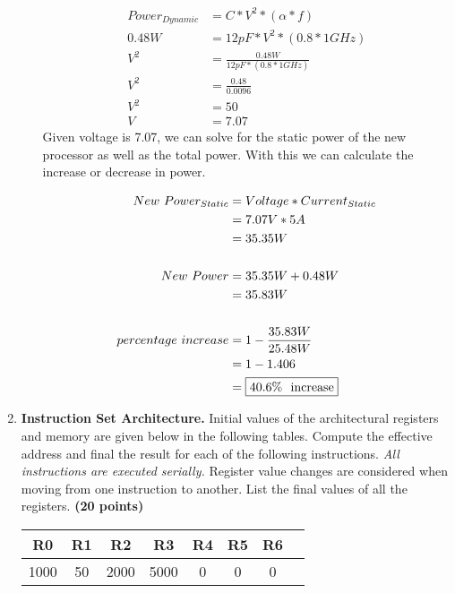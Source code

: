\documentclass[a4paper, 15pt]{exam}
\begin{document}
\begin{enumerate}
\begin{enumerate}
      \begin{align*}
   			Power_{Dynamic} &= C * V^2 * (\alpha * f)\\
   			0.48W &= 12pF * V^2 * (0.8 * 1GHz) \\
   			V^2 &= \frac{0.48W}{12pF * (0.8 * 1GHz)} \\
   			V^2 &= \frac{0.48}{0.0096} \\
   			V^2 &= 50 \\
   			V &= 7.07
   	\end{align*}
   	Given voltage is 7.07, we can solve for the static power of the new processor as well as the total power. With this we can calculate the increase or decrease in power.
   	
   	\begin{align*}
   	New \ Power_{Static} &= Voltage * Current_{Static} \\
   			&= 7.07V * 5A \\
   			&= 35.35W \\ \\	
   	New \ Power &= 35.35W + 0.48W \\
   	&= 35.83W \\ \\
   	   			percentage \ increase &= 1 - \frac{35.83W}{25.48W} \\
   			&= 1 - 1.406 \\
   			&= \fbox{40.6\% \ increase}
   	\end{align*}

	\end{enumerate}

 \item \textbf{Instruction Set Architecture.} Initial values of the architectural registers and memory are given below in the following tables. Compute the effective address and final the result for each of the following instructions. \textit{All instructions are executed serially.} Register value changes are considered when moving from one instruction to another. List the final values of all the registers. \textbf{(20 points)} 
 
 \begin{center}
 	\begin{tabular}{ |c|c|c|c|c|c|c|c|} 
 		\hline
 		R0 & R1 & R2& R3 & R4 &R5&R6\\ 
 		\hline
 		1000 & 50 & 2000 & 5000 &0 & 0 & 0\\ 
 		\hline
 	\end{tabular}
 \end{center}
 

\end{enumerate}
\end{document}
